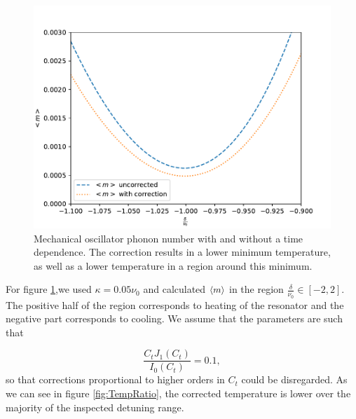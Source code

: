 \documentclass[reprint, amsmath,amssymb, aps,pra]{revtex4-1}
\begin{document}
\begin{figure}[h!]
\includegraphics[scale=.5]{TempGorden1.pdf}   
\caption{ Mechanical oscillator phonon number with and without a time dependence. The correction results in a lower minimum temperature, as well as a lower temperature in a region around this minimum.}\label{fig:TempComparisson}
\end{figure}

For figure \ref{fig:TempComparisson},we used $\kappa = 0.05\nu_0$ and calculated $\expval{m}$ in the region $\frac{\delta}{\nu_0}\in [-2,2]$. The positive half of the region corresponds to heating of the resonator and the negative part corresponds to cooling. We assume that the parameters are such that

\begin{equation}
\frac{C_tJ_1(C_t)}{I_0(C_t)} = 0.1,
\end{equation} so that corrections proportional to higher orders in $C_t$ could be disregarded.  As we can see in figure \ref{fig:TempRatio}, the corrected temperature is lower over the majority of the inspected detuning range. 
\end{document}
